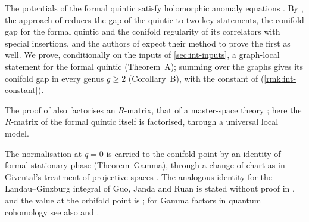 The potentials of the formal quintic satisfy holomorphic anomaly equations \cite[Theorems~1 and~2, \S0.4]{LP20}. By \cite[Remark~1.9]{CGYZ26}, the approach of \cite{GJR18} reduces the gap of the quintic to two key statements, the conifold gap for the formal quintic and the conifold regularity of its correlators with special insertions, and the authors of \cite{CGYZ26} expect their method to prove the first as well. We prove, conditionally on the inputs of \cref{sec:int-inputs}, a graph-local statement for the formal quintic (Theorem~A); summing over the graphs gives its conifold gap in every genus $g\geq2$ (Corollary~B), with the constant of \cite[Conjecture~1.5]{CGYZ26} (\cref{rmk:int-constant}).

The proof of \cite{CGYZ26} also factorises an $R$-matrix, that of a master-space theory \cite[Proposition~3.1]{CGYZ26}; here the $R$-matrix of the formal quintic itself is factorised, through a universal local model. 

The normalisation at $q=0$ is carried to the conifold point by an identity of formal stationary phase (Theorem~Gamma), through a change of chart as in Givental's treatment of projective spaces \cite[\S10]{MR1901075}. The analogous identity for the Landau--Ginzburg integral of Guo, Janda and Ruan is stated without proof in \cite[Remark~7.2]{GJR18}, and the value at the orbifold point is \cite[Lemma~7.7, (37)]{GJR18}; for Gamma factors in quantum cohomology see also \cite[Lemma~4.20]{MR2553377} and \cite{GGI16}. 


